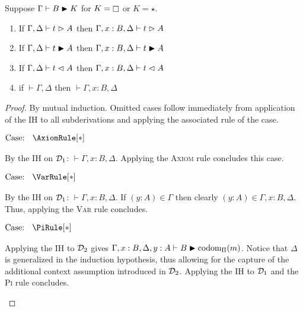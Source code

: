 \begin{lemma}[Weakening]
    Suppose $\Gamma \vdash B \blacktriangleright K$ for $K = \kind$ or $K = \star$.
    \begin{enumerate}
        \item If $\Gamma, \Delta \vdash t \vartriangleright A$ then $\Gamma, x : B, \Delta \vdash t \vartriangleright A$
        \item If $\Gamma, \Delta \vdash t \blacktriangleright A$ then $\Gamma, x : B, \Delta \vdash t \blacktriangleright A$
        \item If $\Gamma, \Delta \vdash t \vartriangleleft A$ then $\Gamma, x : B, \Delta \vdash t \vartriangleleft A$
        \item if $\vdash \Gamma, \Delta$ then $\vdash \Gamma, x : B, \Delta$
    \end{enumerate}
    \label{lem:2:weaken}
\end{lemma}
\begin{proof}
    By mutual induction.
    Omitted cases follow immediately from application of the IH to all subderivations and applying the associated rule of the case.

    $\text{Case: }\begin{array}{c} \AxiomRule[*] \end{array}$
    \begin{proofcase}
        By the IH on $\mathcal{D}_{1}$: $\vdash \Gamma, x : B, \Delta$.
        Applying the \textsc{Axiom} rule concludes this case.
    \end{proofcase}

    $\text{Case: }\begin{array}{c} \VarRule[*] \end{array}$
    \begin{proofcase}        
        By the IH on $\mathcal{D}_{1}$: $\vdash \Gamma, x : B, \Delta$.
        If $(y : A) \in \Gamma$ then clearly $(y : A) \in \Gamma, x : B, \Delta$.
        Thus, applying the \textsc{Var} rule concludes.
    \end{proofcase}

    $\text{Case: }\begin{array}{c} \PiRule[*] \end{array}$
    \begin{proofcase}
        Applying the IH to $\mathcal{D}_{2}$ gives $\Gamma, x : B, \Delta, y : A \vdash B \blacktriangleright \mbox{\normalfont codom}_\Pi(m)$.
        Notice that $\Delta$ is generalized in the induction hypothesis, thus allowing for the capture of the additional context assumption introduced in $\mathcal{D}_{2}$.
        Applying the IH to $\mathcal{D}_{1}$ and the \textsc{Pi} rule concludes.
    \end{proofcase}


\end{proof}

